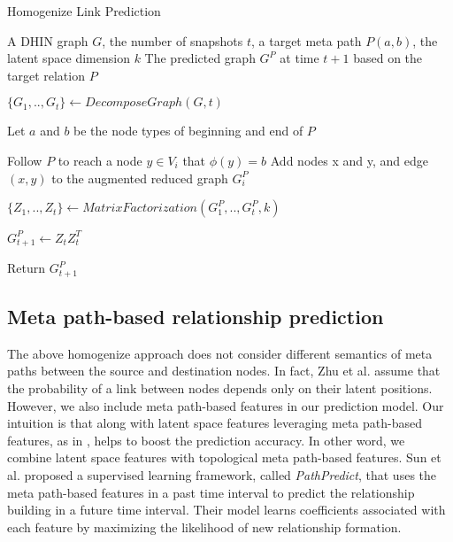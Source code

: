 \begin{algorithm}[t]
\caption{Homogenize Link Prediction}\label{alg1}
\begin{algorithmic}[1]\scriptsize
\REQUIRE A DHIN graph $G$, the number of snapshots $t$, a target meta path $P(a,b)$, the latent space dimension $k$
\ENSURE The predicted graph $G^P$ at time $t+1$ based on the target relation $P$

\STATE $\{G_1, .., G_t\} \leftarrow DecomposeGraph(G, t)$

    \STATE Let $a$ and $b$ be the node types of beginning and end of $P$
    
        \STATE Follow $P$ to reach a node $y\in V_i$ that $\phi(y)=b$%
        \STATE Add nodes x and y, and edge $(x,y)$ to the augmented reduced graph $G_i^P$ 
\ENDFOR

\ENDFOR
\STATE $\{Z_1, .., Z_t\} \leftarrow MatrixFactorization(G^P_1, .., G^P_t, k)$

\STATE $G^P_{t+1} \leftarrow Z_tZ^T_t$ 

\STATE Return $G^P_{t+1}$
\end{algorithmic}
\end{algorithm}



\subsection{Meta path-based relationship prediction}

The above homogenize approach does not consider different semantics of meta paths between the source and destination nodes. In fact, Zhu et al. \cite{Zhu2016} assume that the probability of a link between nodes depends only on their latent positions. However, we also include meta path-based features in our prediction model. Our intuition is that along with latent space features leveraging meta path-based features, as in \cite{sun2011ASONAM}, helps to boost the prediction accuracy. In other word, we combine latent space features with topological meta path-based features. Sun et al. \cite{sun2011ASONAM} proposed a supervised learning framework, called \textit{PathPredict}, that uses the meta path-based features in a past time interval to predict the relationship building in a future time interval. Their model learns coefficients associated with each feature by maximizing the likelihood of new relationship formation.


